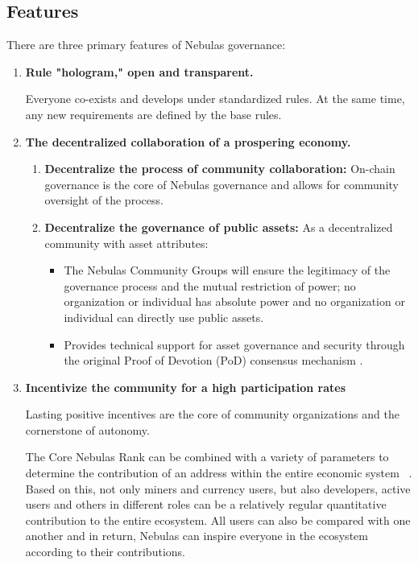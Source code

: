 \subsection{Features}

There are three primary features of Nebulas governance:

\begin{enumerate}
	\item 

	\textbf{Rule "hologram," open and transparent.} 

	Everyone co-exists and develops under standardized rules. At the same time, any new requirements are defined by the base rules.

	\item 

\textbf{The decentralized collaboration of a prospering economy.}


	\begin{enumerate}
		\item 

		\textbf{Decentralize the process of community collaboration:} On-chain governance is the core of Nebulas governance and allows for community oversight of the process.
		
		\item 

		\textbf{Decentralize the governance of public assets:} As a decentralized community with asset attributes:

		\begin{itemize}
			\item The Nebulas Community Groups will ensure the legitimacy of the governance process and the mutual restriction of power; no organization or individual has absolute power and no organization or individual can directly use public assets.
			\item Provides technical support for asset governance and security through the original Proof of Devotion (PoD) consensus mechanism .
		\end{itemize}

	\end{enumerate}

	\item 

	\textbf{Incentivize the community for a high participation rates}
	
	Lasting positive incentives are the core of community organizations and the cornerstone of autonomy.

	The Core Nebulas Rank can be combined with a variety of parameters to determine the contribution of an address within the entire economic system ~\cite{yellowpaper}. Based on this, not only miners and currency users, but also developers, active users and others in different roles can be a relatively regular quantitative contribution to the entire ecosystem. All users can also be compared with one another and in return, Nebulas can inspire everyone in the ecosystem according to their contributions.


\end{enumerate}
